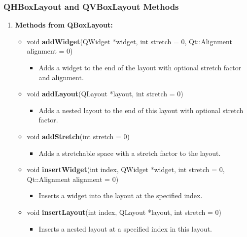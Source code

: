 \documentclass{report}
\begin{document}
    \bigbreak \noindent 
    \subsubsection{QHBoxLayout and QVBoxLayout Methods}
    \begin{enumerate}[label=\textbf{\arabic*.}]
    \item \textbf{Methods from QBoxLayout:}
    \begin{itemize}
        \item void \textbf{addWidget}(QWidget *widget, int stretch = 0, Qt::Alignment alignment = 0)
        \begin{itemize}
            \item Adds a widget to the end of the layout with optional stretch factor and alignment.
        \end{itemize}
        
        \item void \textbf{addLayout}(QLayout *layout, int stretch = 0)
        \begin{itemize}
            \item Adds a nested layout to the end of this layout with optional stretch factor.
        \end{itemize}
        
        \item void \textbf{addStretch}(int stretch = 0)
        \begin{itemize}
            \item Adds a stretchable space with a stretch factor to the layout.
        \end{itemize}
        
        \item void \textbf{insertWidget}(int index, QWidget *widget, int stretch = 0, Qt::Alignment alignment = 0)
        \begin{itemize}
            \item Inserts a widget into the layout at the specified index.
        \end{itemize}
        
        \item void \textbf{insertLayout}(int index, QLayout *layout, int stretch = 0)
        \begin{itemize}
            \item Inserts a nested layout at a specified index in this layout.
        \end{itemize}
        

\end{itemize}
\end{enumerate}
\end{document}
